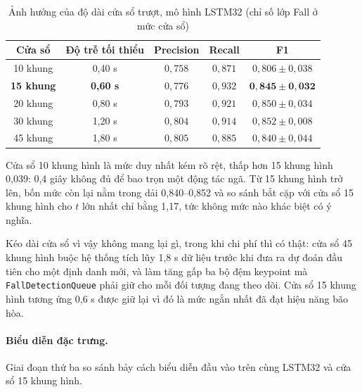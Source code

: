 \begin{table}[htbp]
\centering
\caption{Ảnh hưởng của độ dài cửa sổ trượt, mô hình LSTM32 (chỉ số lớp Fall ở mức cửa sổ)}
\label{tab:lstm_window_sweep}
\small
\begin{tabular}{|c|c|c|c|c|}
\hline
\textbf{Cửa sổ} & \textbf{Độ trễ tối thiểu} & \textbf{Precision} & \textbf{Recall} & \textbf{F1} \\
\hline
10 khung & 0,40 s & $0{,}758$ & $0{,}871$ & $0{,}806\pm0{,}038$ \\
\hline
\textbf{15 khung} & \textbf{0,60 s} & $0{,}776$ & $0{,}932$ & $\mathbf{0{,}845\pm0{,}032}$ \\
\hline
20 khung & 0,80 s & $0{,}793$ & $0{,}921$ & $0{,}850\pm0{,}034$ \\
\hline
30 khung & 1,20 s & $0{,}804$ & $0{,}914$ & $0{,}852\pm0{,}008$ \\
\hline
45 khung & 1,80 s & $0{,}805$ & $0{,}885$ & $0{,}840\pm0{,}044$ \\
\hline
\end{tabular}
\end{table}

Cửa sổ 10 khung hình là mức duy nhất kém rõ rệt, thấp hơn 15 khung hình 0,039: 0,4 giây không đủ để bao trọn một động tác ngã. Từ 15 khung hình trở lên, bốn mức còn lại nằm trong dải 0,840--0,852 và so sánh bắt cặp với cửa sổ 15 khung hình cho $t$ lớn nhất chỉ bằng 1,17, tức không mức nào khác biệt có ý nghĩa.

Kéo dài cửa sổ vì vậy không mang lại gì, trong khi chi phí thì có thật: cửa sổ 45 khung hình buộc hệ thống tích lũy 1,8 s dữ liệu trước khi đưa ra dự đoán đầu tiên cho một định danh mới, và làm tăng gấp ba bộ đệm keypoint mà \texttt{FallDetectionQueue} phải giữ cho mỗi đối tượng đang theo dõi. Cửa sổ 15 khung hình tương ứng 0,6 s được giữ lại vì đó là mức ngắn nhất đã đạt hiệu năng bão hòa.

\paragraph{Biểu diễn đặc trưng.}
Giai đoạn thứ ba so sánh bảy cách biểu diễn đầu vào trên cùng LSTM32 và cửa sổ 15 khung hình.

